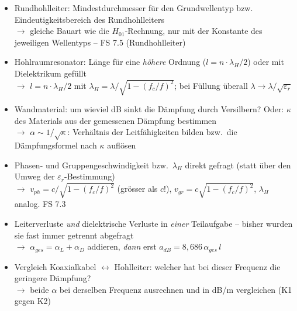 \documentclass[a4paper,10pt]{article}
\begin{document}
\begin{tcolorbox}[colback=A2Farbe!4, colframe=A2Farbe!55, boxrule=0.5pt, arc=1mm, left=3mm, right=2mm, top=2mm, bottom=2mm, breakable, title={\sffamily\bfseries\small Was diesmal neu drankommen könnte \normalfont\itshape\footnotesize -- eigene Prognose (keine offizielle Ankündigung): Umkehrungen, Kombinationen und Transfers zwischen den Aufgabentypen}, coltitle=white, colbacktitle=A2Farbe!70]
\sffamily\small
\begin{itemize}\setlength{\itemsep}{2.2mm}\setlength{\leftmargini}{4mm}
\item Rundhohlleiter: Mindestdurchmesser für den Grundwellentyp bzw. Eindeutigkeitsbereich des Rundhohlleiters\\[0.6mm] {\footnotesize\color{A2Farbe}$\rightarrow$ gleiche Bauart wie die $H_{01}$-Rechnung, nur mit der Konstante des jeweiligen Wellentyps -- FS 7.5 (Rundhohlleiter)}
\item Hohlraumresonator: Länge für eine \emph{höhere} Ordnung ($l=n\cdot\lambda_H/2$) oder mit Dielektrikum gefüllt\\[0.6mm] {\footnotesize\color{A2Farbe}$\rightarrow$ $l=n\cdot\lambda_H/2$ mit $\lambda_H=\lambda/\sqrt{1-(f_c/f)^2}$; bei Füllung überall $\lambda\to\lambda/\sqrt{\varepsilon_r}$}
\item Wandmaterial: um wieviel dB sinkt die Dämpfung durch Versilbern? Oder: $\kappa$ des Materials aus der gemessenen Dämpfung bestimmen\\[0.6mm] {\footnotesize\color{A2Farbe}$\rightarrow$ $\alpha\sim1/\sqrt{\kappa}$: Verhältnis der Leitfähigkeiten bilden bzw.\ die Dämpfungsformel nach $\kappa$ auflösen}
\item Phasen- und Gruppengeschwindigkeit bzw.\ $\lambda_H$ direkt gefragt (statt über den Umweg der $\varepsilon_r$-Bestimmung)\\[0.6mm] {\footnotesize\color{A2Farbe}$\rightarrow$ $v_{ph}=c/\sqrt{1-(f_c/f)^2}$ (grösser als $c$!), $v_{gr}=c\sqrt{1-(f_c/f)^2}$, $\lambda_H$ analog. FS 7.3}
\item Leiterverluste \emph{und} dielektrische Verluste in \emph{einer} Teilaufgabe -- bisher wurden sie fast immer getrennt abgefragt\\[0.6mm] {\footnotesize\color{A2Farbe}$\rightarrow$ $\alpha_{ges}=\alpha_L+\alpha_D$ addieren, \emph{dann} erst $a_{dB}=8{,}686\,\alpha_{ges}\,l$}
\item Vergleich Koaxialkabel $\leftrightarrow$ Hohlleiter: welcher hat bei dieser Frequenz die geringere Dämpfung?\\[0.6mm] {\footnotesize\color{A2Farbe}$\rightarrow$ beide $\alpha$ bei derselben Frequenz ausrechnen und in dB/m vergleichen (K1 gegen K2)}
\end{itemize}\end{tcolorbox}
\end{document}
